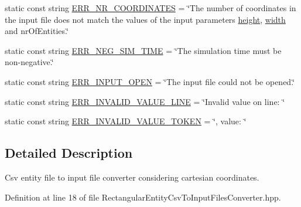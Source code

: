 \begin{DoxyCompactItemize}
\item 
static const string \hyperlink{classmultiscale_1_1video_1_1RectangularEntityCsvToInputFilesConverter_ac290c5c37c0be34a4091f441c4fa67ec}{\-E\-R\-R\-\_\-\-N\-R\-\_\-\-C\-O\-O\-R\-D\-I\-N\-A\-T\-E\-S} = \char`\"{}\-The number of coordinates in the input file does not match the values of the input parameters \hyperlink{classmultiscale_1_1video_1_1RectangularEntityCsvToInputFilesConverter_a68cb5dba20157ea4977c1069626cb0ab}{height}, \hyperlink{classmultiscale_1_1video_1_1RectangularEntityCsvToInputFilesConverter_ac4542ad4008e85ab4860146eed6e0200}{width} and nr\-Of\-Entities.\char`\"{}
\item 
static const string \hyperlink{classmultiscale_1_1video_1_1RectangularEntityCsvToInputFilesConverter_a54116309bc8f25763b6b8bd7c6b5963a}{\-E\-R\-R\-\_\-\-N\-E\-G\-\_\-\-S\-I\-M\-\_\-\-T\-I\-M\-E} = \char`\"{}\-The simulation time must be non-\/negative.\char`\"{}
\item 
static const string \hyperlink{classmultiscale_1_1video_1_1RectangularEntityCsvToInputFilesConverter_aee92e4b54436bedade20bfb4914fcd09}{\-E\-R\-R\-\_\-\-I\-N\-P\-U\-T\-\_\-\-O\-P\-E\-N} = \char`\"{}\-The input file could not be opened.\char`\"{}
\item 
static const string \hyperlink{classmultiscale_1_1video_1_1RectangularEntityCsvToInputFilesConverter_a4041e7ae4c22d07ebcb8f709aeb483d5}{\-E\-R\-R\-\_\-\-I\-N\-V\-A\-L\-I\-D\-\_\-\-V\-A\-L\-U\-E\-\_\-\-L\-I\-N\-E} = \char`\"{}\-Invalid value on line\-: \char`\"{}
\item 
static const string \hyperlink{classmultiscale_1_1video_1_1RectangularEntityCsvToInputFilesConverter_aa5359492461a23510f983cd09b876dfb}{\-E\-R\-R\-\_\-\-I\-N\-V\-A\-L\-I\-D\-\_\-\-V\-A\-L\-U\-E\-\_\-\-T\-O\-K\-E\-N} = \char`\"{}, value\-: \char`\"{}
\end{DoxyCompactItemize}


\subsection{\-Detailed \-Description}
\-Csv entity file to input file converter considering cartesian coordinates. 

\-Definition at line 18 of file \-Rectangular\-Entity\-Csv\-To\-Input\-Files\-Converter.\-hpp.



